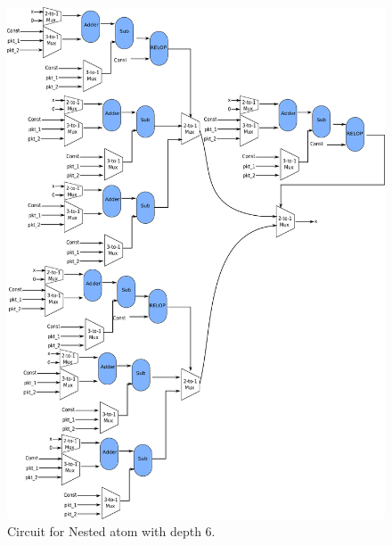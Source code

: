 \newpage
\begin{figure}[!htbp]
  \includegraphics[width=\textwidth]{nested.pdf}
  \caption{Circuit for Nested atom with depth 6.}
  \label{fig:nested}
\end{figure}

